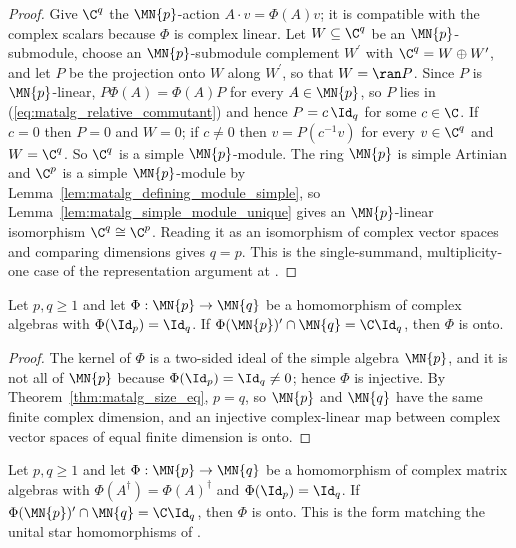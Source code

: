 \begin{proof}\leanok
    Give $\C^q$ the $\MN{p}$-action $A\cdot v=\Phi(A)v$; it is compatible
    with the complex scalars because $\Phi$ is complex linear.  Let
    $W\subseteq\C^q$ be an $\MN{p}$-submodule, choose an $\MN{p}$-submodule
    complement $W^{\prime}$ with $\C^q=W\oplus W^{\prime}$, and let $P$ be
    the projection onto $W$ along $W^{\prime}$, so that $W=\ran P$.  Since
    $P$ is
    $\MN{p}$-linear, $P\Phi(A)=\Phi(A)P$ for every $A\in\MN{p}$, so $P$
    lies in (\ref{eq:matalg_relative_commutant}) and hence $P=c\,\Id_q$ for
    some $c\in\C$.  If $c=0$ then $P=0$ and $W=0$; if $c\neq0$ then
    $v=P(c^{-1}v)$ for every $v\in\C^q$ and $W=\C^q$.  So $\C^q$ is a
    simple $\MN{p}$-module.  The ring $\MN{p}$ is simple Artinian and
    $\C^p$ is a simple $\MN{p}$-module by
    Lemma~\ref{lem:matalg_defining_module_simple}, so
    Lemma~\ref{lem:matalg_simple_module_unique} gives an $\MN{p}$-linear
    isomorphism $\C^q\cong\C^p$.  Reading it as an isomorphism of complex
    vector spaces and comparing dimensions gives $q=p$.  This is the
    single-summand, multiplicity-one case of the representation argument at
    \cite[lines~2101--2116]{SchumacherWerner2004QCA}.
\end{proof}

\begin{theorem}
    \label{thm:matalg_surjective_of_scalar_relative_commutant}
    \leanok
    Let $p,q\geq1$ and let $\Phi:\MN{p}\to\MN{q}$ be a homomorphism of
    complex algebras with $\Phi(\Id_p)=\Id_q$.  If
    $\Phi(\MN{p})^{\prime}\cap\MN{q}=\C\Id_q$, then $\Phi$ is onto.
\end{theorem}

\begin{proof}\leanok
    The kernel of $\Phi$ is a two-sided ideal of the simple algebra
    $\MN{p}$, and it is not all of $\MN{p}$ because
    $\Phi(\Id_p)=\Id_q\neq0$; hence $\Phi$ is injective.  By
    Theorem~\ref{thm:matalg_size_eq}, $p=q$, so $\MN{p}$ and $\MN{q}$ have
    the same finite complex dimension, and an injective complex-linear map
    between complex vector spaces of equal finite dimension is onto.
\end{proof}

\begin{theorem}
    \label{thm:matalg_surjective_star}
    \leanok
    Let $p,q\geq1$ and let $\Phi:\MN{p}\to\MN{q}$ be a homomorphism of
    complex matrix algebras with $\Phi(A^\dagger)=\Phi(A)^\dagger$ and
    $\Phi(\Id_p)=\Id_q$.  If
    $\Phi(\MN{p})^{\prime}\cap\MN{q}=\C\Id_q$, then $\Phi$ is onto.  This
    is the form matching the unital star homomorphisms of
    \cite[lines~2101--2105]{SchumacherWerner2004QCA}.
\end{theorem}

